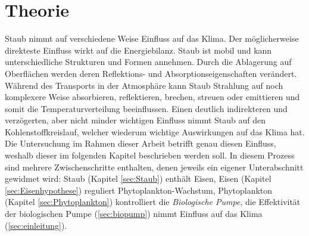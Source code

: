 \documentclass[12pt,a4paper,onecolumn,headheight=30pt]{scrartcl}
\begin{document}
\section{Theorie} \label{sec:Theorie}
Staub nimmt auf verschiedene Weise Einfluss auf das Klima. Der möglicherweise direkteste Einfluss wirkt auf die Energiebilanz. Staub ist mobil und kann unterschiedliche Strukturen und Formen annehmen. Durch die Ablagerung auf Oberflächen werden deren Reflektions- und Absorptionseigenschaften verändert. Während des Transports in der Atmosphäre kann Staub Strahlung auf noch komplexere Weise absorbieren, reflektieren, brechen, streuen oder emittieren \citep{Shao.2011} und somit die Temperaturverteilung beeinflussen. Einen deutlich indirekteren und verzögerten, aber nicht minder wichtigen Einfluss nimmt Staub auf den Kohlenstoffkreislauf, welcher wiederum wichtige Auswirkungen auf das Klima hat. Die Untersuchung im Rahmen dieser Arbeit betrifft genau diesen Einfluss, weshalb dieser im folgenden Kapitel beschrieben werden soll. In diesem Prozess sind mehrere Zwischenschritte enthalten, denen jeweils ein eigener Unterabschnitt gewidmet wird: Staub (Kapitel \ref{sec:Staub}) enthält Eisen, Eisen (Kapitel \ref{sec:Eisenhypothese}) reguliert Phytoplankton-Wachstum, Phytoplankton (Kapitel \ref{sec:Phytoplankton}) kontrolliert die \textit{Biologische Pumpe}, die Effektivität der biologischen Pumpe (\ref{sec:biopump}) nimmt Einfluss auf das Klima (\ref{sec:einleitung}).
\end{document}

